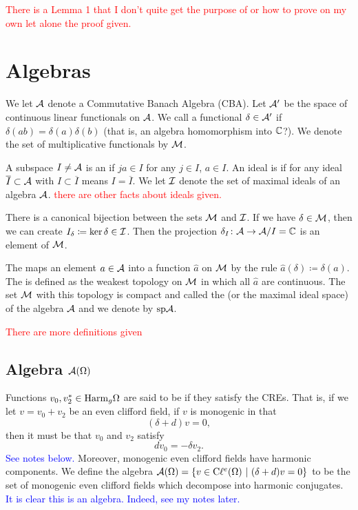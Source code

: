 \textcolor{red}{There is a Lemma 1 that I don't quite get the purpose of or how to prove on my own let alone the proof given.}

\section{Algebras}

We let $\mathcal{A}$ denote a Commutative Banach Algebra (CBA). Let $\mathcal{A}'$ be the space of continuous linear functionals on $\mathcal{A}$.  We call a functional $\delta\in \mathcal{A}'$  if $\delta(ab)=\delta(a)\delta(b)$  (that is, an algebra homomorphism into $\mathbb{C}$?). We denote the set of multiplicative functionals by $\mathcal{M}$.

 A subspace $I\neq \mathcal{A}$ is an  if $ja\in I$ for any $j\in I$, $a\in I$.  An ideal is  if for any ideal $\overline{I}\subset \mathcal{A}$ with $I\subset \overline{I}$ means $I=\overline{I}$. We let $\mathcal{I}$ denote the set of maximal ideals of an algebra $\mathcal{A}$. \textcolor{red}{there are other facts about ideals given.}

There is a canonical bijection between the sets $\mathcal{M}$ and $\mathcal{I}$. If we have $\delta \in \mathcal{M}$, then we can create $I_\delta\coloneqq \ker \delta \in \mathcal{I}$. Then the projection $\delta_I\colon \mathcal{A} \to \mathcal{A}/I=\mathbb{C}$ is an element of $\mathcal{M}$.  

The  maps an element $a\in \mathcal{A}$ into a function $\hat{a}$ on $\mathcal{M}$ by the rule $\hat{a}(\delta)\coloneqq \delta(a)$. The  is defined as the weakest topology on $\mathcal{M}$ in which all $\hat{a}$ are continuous. The set $\mathcal{M}$ with this topology is compact and called the  (or the maximal ideal space) of the algebra $\mathcal{A}$ and we denote by $\mathrm{sp} \mathcal{A}$.

\textcolor{red}{There are more definitions given}

\subsection{Algebra $\mathcal{A} (\Omega)$}

Functions $v_0,v_2^* \in \mathrm{Harm}_g \Omega$ are said to be  if they satisfy the CREs. That is, if we let $v=v_0+v_2$ be an even clifford field, if $v$ is monogenic in that
\[
(\delta + d)v = 0,
\]
then it must be that $v_0$ and $v_2$ satisfy
\[
dv_0 = -\delta v_2.
\]
\textcolor{blue}{See notes below.} Moreover, monogenic even clifford fields have harmonic components. We define the algebra $\mathcal{A}(\Omega)=\{v\in \mathrm{C}\ell^e(\Omega) ~\vert~ (\delta+d)v=0\}$ to be the set of monogenic even clifford fields which decompose into harmonic conjugates.  \textcolor{blue}{It is clear this is an algebra. Indeed, see my notes later.}

